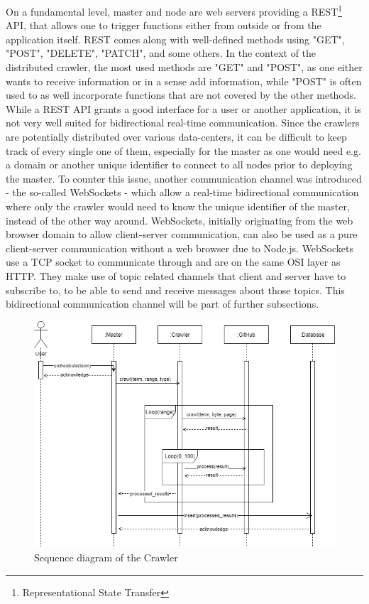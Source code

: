 On a fundamental level, master and node are web servers providing a REST\footnote{Representational State Transfer} API, that allows one to trigger functions either from outside or from the application itself. REST comes along with well-defined methods using "GET", "POST", "DELETE", "PATCH", and some others. In the context of the distributed crawler, the most used methods are "GET" and "POST", as one either wants to receive information or in a sense add information, while "POST" is often used to as well incorporate functions that are not covered by the other methods.
While a REST API grants a good interface for a user or another application, it is not very well suited for bidirectional real-time communication. Since the crawlers are potentially distributed over various data-centers, it can be difficult to keep track of every single one of them, especially for the master as one would need e.g. a domain or another unique identifier to connect to all nodes prior to deploying the master. To counter this issue, another communication channel was introduced - the so-called WebSockets - which allow a real-time bidirectional communication where only the crawler would need to know the unique identifier of the master, instead of the other way around. WebSockets, initially originating from the web browser domain to allow client-server communication, can also be used as a pure client-server communication without a web browser due to Node.js. WebSockets use a TCP socket to communicate through and are on the same OSI layer as HTTP. They make use of topic related channels that client and server have to subscribe to, to be able to send and receive messages about those topics. This bidirectional communication channel will be part of further subsections.

\begin{figure}[H]
    \centering
    \includegraphics[scale=0.5]{graphics/crawler_sequence.png}
    \caption{Sequence diagram of the Crawler}
    \label{fig:seq_dia_crawler}
\end{figure}

